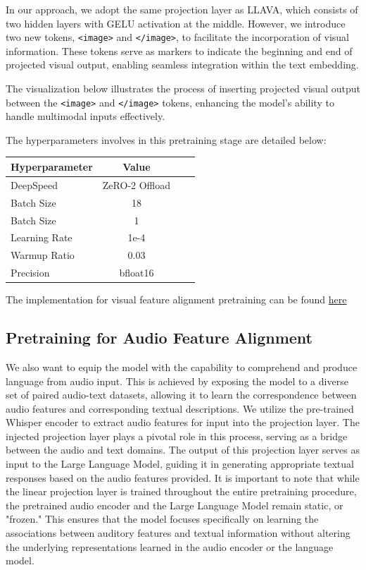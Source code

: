 \documentclass[preprint]{article}
\begin{document}
In our approach, we adopt the same projection layer as LLAVA, which consists of two hidden layers with GELU activation at the middle. However, we introduce two new tokens, \texttt{<image>} and \texttt{</image>}, to facilitate the incorporation of visual information. These tokens serve as markers to indicate the beginning and end of projected visual output, enabling seamless integration within the text embedding.

The visualization below illustrates the process of inserting projected visual output between the \texttt{<image>} and \texttt{</image>} tokens, enhancing the model's ability to handle multimodal inputs effectively.

The hyperparameters involves in this pretraining stage are detailed below:

\begin{table}[h]
  \centering
  \begin{tabular}{lccl}
    \hline
    \textbf{Hyperparameter} & \textbf{Value} \\
    \hline
    DeepSpeed               & ZeRO-2 Offload \\
    Batch Size              & 18             \\
    Batch Size              & 1              \\
    Learning Rate           & 1e-4           \\
    Warmup Ratio            & 0.03           \\
    Precision               & bfloat16       \\
    \hline
  \end{tabular}
\end{table}

The implementation for visual feature alignment pretraining can be found \href{https://github.com/mesolitica/multimodal-LLM/tree/master/vision-only}{here}

\subsection{Pretraining for Audio Feature Alignment}

We also want to equip the model with the capability to comprehend and produce language from audio input. This is achieved by exposing the model to a diverse set of paired audio-text datasets, allowing it to learn the correspondence between audio features and corresponding textual descriptions. We utilize the pre-trained Whisper encoder to extract audio features for input into the projection layer. The injected projection layer plays a pivotal role in this process, serving as a bridge between the audio and text domains. The output of this projection layer serves as input to the Large Language Model, guiding it in generating appropriate textual responses based on the audio features provided. It is important to note that while the linear projection layer is trained throughout the entire pretraining procedure, the pretrained audio encoder and the Large Language Model remain static, or "frozen." This ensures that the model focuses specifically on learning the associations between auditory features and textual information without altering the underlying representations learned in the audio encoder or the language model.
\end{document}
